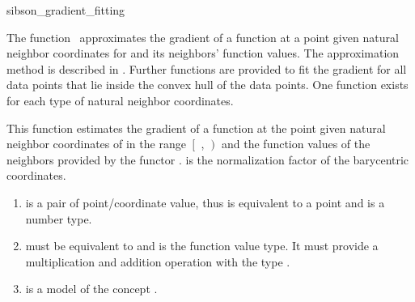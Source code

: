 
\begin{ccRefFunction}{sibson_gradient_fitting}

\ccDefinition
  
The function \ccRefName\ approximates the gradient of a function at a
point  given natural neighbor coordinates for  and its
neighbors' function values. The approximation method is described in
\cite{s-bdnni-81}. Further functions are provided to fit the gradient
for all data points that lie inside the convex hull of the data
points. One function exists for each type of natural neighbor
coordinates.


 { This function estimates the
  gradient of a function at the point  given natural neighbor
  coordinates of  in the range $\left[\right.$ ,
  $\left.\right)$ and the function values of the neighbors
  provided by the functor .   is the normalization
  factor of the barycentric coordinates.}

\begin{enumerate}
\item {} is a pair of point/coordinate
  value, thus  is
  equivalent to a point and
   is a
  number type. 
\item {} must be equivalent to
   and
   is the function value type. It must
  provide a multiplication and addition operation with the type
  .
\item  {} is a model of the concept 
  .
\end{enumerate}


\end{ccRefFunction}
